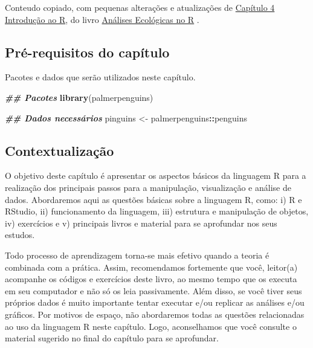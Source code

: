 \documentclass[
]{article}
\newenvironment{Shaded}{\begin{snugshade}}{\end{snugshade}}
\newcommand{\DocumentationTok}[1]{\textcolor[rgb]{0.56,0.35,0.01}{\textbf{\textit{#1}}}}
\newcommand{\FunctionTok}[1]{\textcolor[rgb]{0.13,0.29,0.53}{\textbf{#1}}}
\newcommand{\NormalTok}[1]{#1}
\newcommand{\OtherTok}[1]{\textcolor[rgb]{0.56,0.35,0.01}{#1}}
\newcommand{\SpecialCharTok}[1]{\textcolor[rgb]{0.81,0.36,0.00}{\textbf{#1}}}
\begin{document}
Conteudo copiado, com pequenas alterações e atualizações de \href{https://analises-ecologicas.com/cap4}{Capítulo 4 Introdução ao R}, do livro \href{https://analises-ecologicas.com/}{Análises Ecológicas no R} .

\hypertarget{pruxe9-requisitos-do-capuxedtulo}{%
\subsection*{Pré-requisitos do capítulo}\label{pruxe9-requisitos-do-capuxedtulo}}

Pacotes e dados que serão utilizados neste capítulo.

\begin{Shaded}
\begin{Highlighting}[]
\DocumentationTok{\#\# Pacotes}
\FunctionTok{library}\NormalTok{(palmerpenguins)}

\DocumentationTok{\#\# Dados necessários}
\NormalTok{pinguins }\OtherTok{\textless{}{-}}\NormalTok{ palmerpenguins}\SpecialCharTok{::}\NormalTok{penguins}
\end{Highlighting}
\end{Shaded}

\hypertarget{contextualizauxe7uxe3o}{%
\subsection{Contextualização}\label{contextualizauxe7uxe3o}}

O objetivo deste capítulo é apresentar os aspectos básicos da linguagem R para a realização dos principais passos para a manipulação, visualização e análise de dados. Abordaremos aqui as questões básicas sobre a linguagem R, como: i) R e RStudio, ii) funcionamento da linguagem, iii) estrutura e manipulação de objetos, iv) exercícios e v) principais livros e material para se aprofundar nos seus estudos.

Todo processo de aprendizagem torna-se mais efetivo quando a teoria é combinada com a prática. Assim, recomendamos fortemente que você, leitor(a) acompanhe os códigos e exercícios deste livro, ao mesmo tempo que os executa em seu computador e não só os leia passivamente. Além disso, se você tiver seus próprios dados é muito importante tentar executar e/ou replicar as análises e/ou gráficos. Por motivos de espaço, não abordaremos todas as questões relacionadas ao uso da linguagem R neste capítulo. Logo, aconselhamos que você consulte o material sugerido no final do capítulo para se aprofundar.
\end{document}
